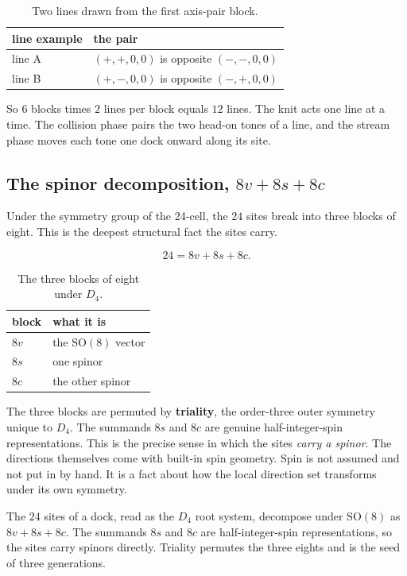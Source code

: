 \begin{table}[ht]
\centering
\begin{tabular}{@{}ll@{}}
\toprule
line example & the pair \\
\midrule
line A & $(+,+,0,0)$ is opposite $(-,-,0,0)$ \\
line B & $(+,-,0,0)$ is opposite $(-,+,0,0)$ \\
\bottomrule
\end{tabular}
\caption{Two lines drawn from the first axis-pair block.}
\label{tab:lines}
\end{table}

So $6$ blocks times $2$ lines per block equals $12$ lines. The knit acts one line at a time. The collision phase pairs the two head-on tones of a line, and the stream phase moves each tone one dock onward along its site.

\subsection{The spinor decomposition, $8v + 8s + 8c$}

Under the symmetry group of the 24-cell, the $24$ sites break into three blocks of eight. This is the deepest structural fact the sites carry.

\[
24 = 8v + 8s + 8c.
\]

\begin{table}[ht]
\centering
\begin{tabular}{@{}ll@{}}
\toprule
block & what it is \\
\midrule
$8v$ & the $\mathrm{SO}(8)$ vector \\
$8s$ & one spinor \\
$8c$ & the other spinor \\
\bottomrule
\end{tabular}
\caption{The three blocks of eight under $D_4$.}
\label{tab:triality}
\end{table}

The three blocks are permuted by \textbf{triality}, the order-three outer symmetry unique to $D_4$. The summands $8s$ and $8c$ are genuine half-integer-spin representations. This is the precise sense in which the sites \emph{carry a spinor}. The directions themselves come with built-in spin geometry. Spin is not assumed and not put in by hand. It is a fact about how the local direction set transforms under its own symmetry.

\begin{proposition}
The $24$ sites of a dock, read as the $D_4$ root system, decompose under $\mathrm{SO}(8)$ as $8v + 8s + 8c$. The summands $8s$ and $8c$ are half-integer-spin representations, so the sites carry spinors directly. Triality permutes the three eights and is the seed of three generations.
\end{proposition}

